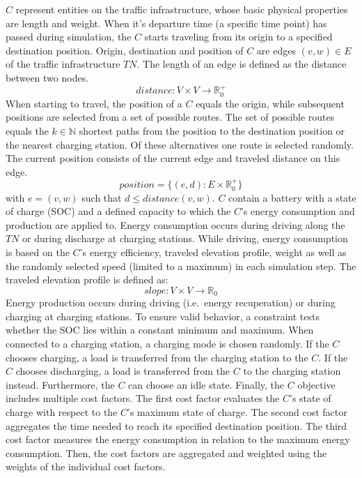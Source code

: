 $C$ represent entities on the traffic infrastructure, whose basic physical properties are length and weight.
When it's departure time (a specific time point) has passed during simulation, the $C$ starts traveling from its origin to a specified destination position. Origin, destination and position of $C$ are edges $(v,w) \in E$ of the traffic infrastructure $TN$. The length of an edge is defined as the distance between two nodes.
$$\mathit{distance}: V \times V \to\mathbb{R}_0^+$$ 
When starting to travel, the position of a $C$ equals the origin, while subsequent positions are selected from a set of possible routes. The set of possible routes equals the $k \in \mathbb{N}$ shortest paths from the position to the destination position or the nearest charging station. Of these alternatives one route is selected randomly. The current position consists of the current edge and traveled distance on this edge.
$$\mathit{position} = \{(e,d): E \times \mathbb{R}_0^+ \}$$ 
with $e = (v,w)$ such that $d \leq distance(v,w)$.
$C$ contain a battery with a state of charge (SOC) and a defined capacity to which the $C$'s energy consumption and production are applied to.
Energy consumption occurs during driving along the $TN$ or during discharge at charging stations. While driving, energy consumption is based on the $C$'s energy efficiency, traveled elevation profile, weight as well as the randomly selected speed (limited to a maximum) in each simulation step. The traveled elevation profile is defined as:
$$\mathit{slope} : V \times V \to \mathbb{R}_0$$ 
Energy production occurs during driving (i.e.\ energy recuperation) or during charging at charging stations. To ensure valid behavior, a constraint tests whether the SOC lies within a constant minimum and maximum. When connected to a charging station, a charging mode is chosen randomly. If the $C$ chooses charging, a load is transferred from the charging station to the $C$. If the $C$ chooses discharging, a load is transferred from the $C$ to the charging station instead. Furthermore, the $C$ can choose an idle state.
Finally, the $C$ objective includes multiple cost factors.
The first cost factor evaluates the $C$'s state of charge with respect to the $C$'s maximum state of charge. The second cost factor aggregates the time needed to reach its specified destination position. The third cost factor measures the energy consumption in relation to the maximum energy consumption. Then, the cost factors are aggregated and weighted using the weights of the individual cost factors.


